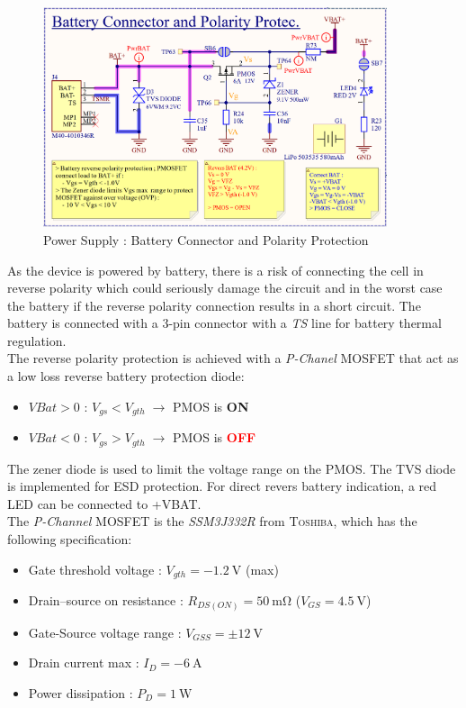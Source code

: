 \documentclass[report.tex]{subfiles}
\begin{document}
\begin{figure}[H]
	\centering
	\includegraphics[width=0.9\textwidth]{Include/Figure/Hardware/LTEWatch_Power_Supply_Batt_Conn_Polarity_Protection}
	\caption{Power Supply : Battery Connector and Polarity Protection}
	\label{fig:LTEWatch_Power_Supply_Batt_Conn_Polarity_Protection}
\end{figure}

As the device is powered by battery, there is a risk of connecting the cell in reverse polarity which could seriously damage the circuit and in the worst case the battery if the reverse polarity connection results in a short circuit. The battery is connected with a 3-pin connector with a \textit{TS} line for battery thermal regulation.\\

The reverse polarity protection is achieved with a \textit{P-Chanel} MOSFET that act as a low loss reverse battery protection diode:
\begin{itemize}
\item $VBat > 0$ : $V_{gs} < V_{gth} \; \rightarrow$ PMOS is \textbf{\textcolor{mygreen}{ON}}
\item $VBat < 0$ : $V_{gs} > V_{gth} \; \rightarrow$ PMOS is \textbf{\textcolor{red}{OFF}}
\end{itemize}

The zener diode is used to limit the voltage range on the PMOS. The TVS diode is implemented for ESD protection. For direct revers battery indication, a red LED can be connected to +VBAT.\\

The \textit{P-Channel} MOSFET is the \textit{SSM3J332R}\cite{SSM3J332R} from \textsc{Toshiba}, which has the following specification:
\begin{itemize}
\item Gate threshold voltage : $V_{gth}= \SI{-1.2}{\volt}$ (max)
\item Drain–source on resistance : $R_{DS(ON)} = \SI{50}{\milli\ohm}$ ($V_{GS} = \SI{4.5}{\volt}$)
\item Gate-Source voltage range : $V_{GSS} = \pm \SI{12}{\volt}$
\item Drain current max : $I_D = \SI{-6}{\ampere}$
\item Power dissipation : $P_D = \SI{1}{\watt}$
\end{itemize}
\end{document}
